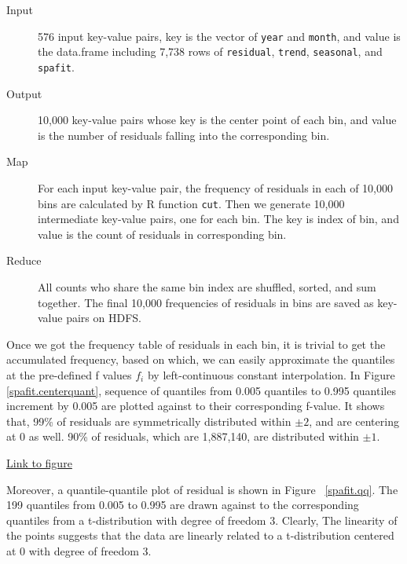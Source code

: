 \begin{description}
  \item[Input] 576 input key-value pairs, key is the vector of \texttt{year} and
  \texttt{month}, and value is the data.frame including 7,738 rows of 
  \texttt{residual}, \texttt{trend}, \texttt{seasonal}, and \texttt{spafit}.
  \item[Output] 10,000 key-value pairs whose key is the center point of each 
  bin, and value is the number of residuals falling into the corresponding bin.
  \item[Map] For each input key-value pair, the frequency of residuals in each
  of 10,000 bins are calculated by R function \texttt{cut}. Then we generate
  10,000 intermediate key-value pairs, one for each bin. The key is index of bin,
  and value is the count of residuals in corresponding bin. 
  \item[Reduce] All counts who share the same bin index are shuffled, sorted, and
  sum together. The final 10,000 frequencies of residuals in bins are saved as
  key-value pairs on HDFS.
\end{description}

Once we got the frequency table of residuals in each bin, it is trivial to get
the accumulated frequency, based on which, we can easily approximate the 
quantiles at the pre-defined f values $f_i$ by left-continuous constant 
interpolation. In Figure~
\href{../plots/a1950/spafit/d2/span0.015/a1950.residual.centerquant.pdf}
{\ref*{spafit.centerquant}}, sequence of quantiles from 0.005 quantiles to 0.995
quantiles increment by 0.005 are plotted against to their corresponding f-value.
It shows that, 99\% of residuals are symmetrically distributed within $\pm 2$, 
and are centering at 0 as well. 90\% of residuals, which are 1,887,140, are 
distributed within $\pm 1$.

\begin{framed}
\begin{center}
  \href{../plots/a1950/spafit/d2/span0.015/a1950.residual.centerquant.pdf}
  {Link to figure}
  \label{spafit.centerquant}
\end{center}
\end{framed}

Moreover, a quantile-quantile plot of residual is shown in Figure~
\href{../plots/a1950/spafit/d2/span0.015/a1950.residual.QQ.pdf}
{\ref*{spafit.qq}}. The 199 quantiles from 0.005 to 0.995 are drawn against to
the corresponding quantiles from a t-distribution with degree of freedom 3. 
Clearly, The linearity of the points suggests that the data are linearly related
to a t-distribution centered at 0 with degree of freedom 3.

